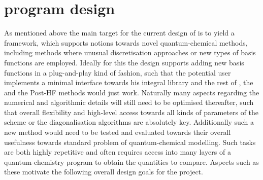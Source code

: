 \section{\molsturm program design}
\label{sec:MolsturmDesign}

As mentioned above the main target for the current design of \molsturm
is to yield a framework,
which supports notions towards novel quantum-chemical methods,
including methods where unusual discretisation approaches
or new types of basis functions are employed.
Ideally for this the design supports adding
new basis functions 
in a plug-and-play kind of fashion,
such that the potential user implements a minimal interface
towards his integral library and the rest of \molsturm,
\ie the \SCF and the Post-HF methods would just work.
Naturally many aspects regarding the numerical and algorithmic
details will still need to be optimised thereafter,
such that overall flexibility and high-level access towards
all kinds of parameters of the \SCF scheme or the
diagonalisation algorithms are absolutely key.
Additionally such a new method would need to be tested and evaluated
towards their overall usefulness towards standard problem
of quantum-chemical modelling.
Such tasks are both highly repetitive and often requires
access into many layers of a quantum-chemistry program
to obtain the quantities to compare.
Aspects such as these motivate
the following overall design goals for the \molsturm project.

